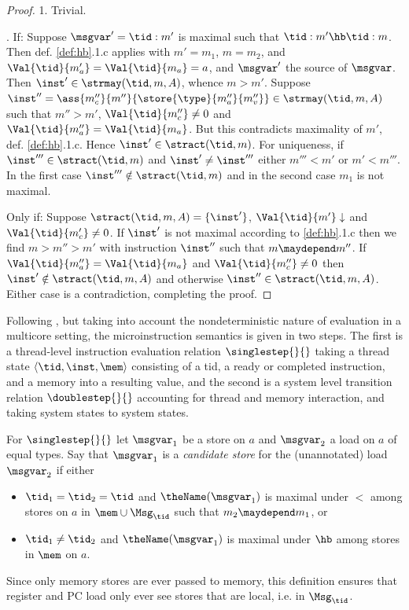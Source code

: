 \begin{proof}
1. Trivial.

. If: Suppose $\msgvar'=\tid:m'$ is maximal such that $\tid:m'\hb\tid:m$. Then def. \ref{def:hb}.1.c applies with $m'=m_1$, $m=m_2$, and $\Val{\tid}{m_a'} = \Val{\tid}{m_a} = a$, and $\msgvar'$ the source of $\msgvar$. 
Then $\inst'\in\strmay(\tid,m,A)$, whence $m> m'$. Suppose $\inst''=\ass{m_c''}{m''}{\store{\type}{m_a''}{m_v''}}\in\strmay(\tid,m,A)$ such that $m''>m'$, $\Val{\tid}{m_c''}\neq 0$ and $\Val{\tid}{m_a''} =\Val{\tid}{m_a}$. But this contradicts maximality of $m'$, def. \ref{def:hb}.1.c. Hence
$\inst'\in\stract(\tid,m)$. For uniqueness, if $\inst'''\in\stract(\tid,m)$ and
$\inst'\neq\inst'''$ either $m'''< m'$ or $m' < m'''$. In the first case
$\inst'''\notin\stract(\tid,m)$ and in the second case $m_1$ is not maximal.

Only if: 
Suppose $\stract(\tid,m,A) = \{\inst'\}$, $\Val{\tid}{m'}\downarrow$ and $\Val{\tid}{m_c'}\neq 0$. If $\inst'$ is not maximal according to \ref{def:hb}.1.c
then we find $m>m''>m'$ with instruction $\inst''$ such that $m\maydepend m''$.
If $\Val{\tid}{m_a''}=\Val{\tid}{m_a}$ and $\Val{\tid}{m_c''}\neq 0$ then
$\inst'\notin\stract(\tid,m,A)$ and otherwise $\inst''\in\stract(\tid,m,A)$. Either case is a contradiction, completing the proof.
\end{proof}

\medskip

Following \cite{MIL}, but taking into account the nondeterministic nature of
evaluation in a multicore setting, the microinstruction semantics is given in two steps.  The first is a thread-level instruction evaluation relation
$\singlestep{}{}$ taking a thread state $\langle \tid,\inst,\mem\rangle$ consisting of a tid, a ready or completed instruction, and a memory into a resulting value, and
the second is a system level transition relation $\doublestep{}{}$ accounting for thread and memory interaction, and taking system states to system states.

For $\singlestep{}{}$ let $\msgvar_1$ be a store on $a$ and
$\msgvar_2$ a load on $a$ of equal types. Say that $\msgvar_1$ is a \emph{candidate store} for the (unannotated) load $\msgvar_2$ if either
\begin{itemize}
\item $\tid_1=\tid_2=\tid$ and $\theName(\msgvar_1)$ is maximal under $<$ among stores on $a$ in $\mem\cup\Msg_\tid$ such that $m_2\maydepend m_1$, or
\item $\tid_1\neq\tid_2$ and $\theName(\msgvar_1)$ is maximal under $\hb$
among stores in $\mem$ on $a$.
\end{itemize}
Since only memory stores are ever passed to memory, this definition ensures that
register and PC load only ever see stores that are local, i.e. in  $\Msg_\tid$.

